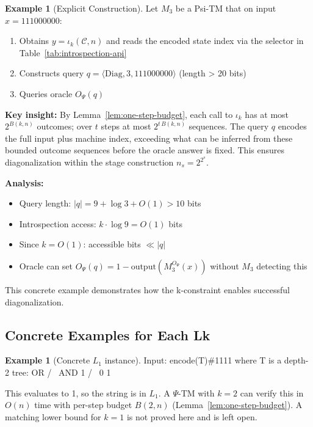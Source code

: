 \documentclass[11pt]{article}
\theoremstyle{plain}
\theoremstyle{definition}
\newtheorem{example}[theorem]{Example}
\newcommand{\PSi}{\Psi}
\begin{document}
\begin{example}[Explicit Construction]
\label{ex:concrete-diagonalization}
Let $M_3$ be a Psi-TM that on input $x = 111000000$:
\begin{enumerate}
\item Obtains $y=\iota_k(\mathcal{C},n)$ and reads the encoded state index via the selector in Table~\ref{tab:introspection-api}
\item Constructs query $q = \langle \text{Diag}, 3, 111000000 \rangle$ (length > 20 bits)
\item Queries oracle $O_\Psi(q)$
\end{enumerate}

\textbf{Key insight:} By Lemma~\ref{lem:one-step-budget}, each call to $\iota_k$ has at most $2^{B(k,n)}$ outcomes; over $t$ steps at most $2^{t\,B(k,n)}$ sequences. The query $q$ encodes the full input plus machine index, exceeding what can be inferred from these bounded outcome sequences before the oracle answer is fixed. This ensures diagonalization within the stage construction $n_s=2^{2^s}$.

\textbf{Analysis:}
\begin{itemize}
\item Query length: $|q| = 9 + \log 3 + O(1) > 10$ bits
\item Introspection access: $k \cdot \log 9 = O(1)$ bits
\item Since $k = O(1)$: accessible bits $\ll |q|$
\item Oracle can set $O_\Psi(q) = 1 - \text{output}(M_3^{O_\Psi}(x))$ without $M_3$ detecting this
\end{itemize}

This concrete example demonstrates how the k-constraint enables successful diagonalization.
\end{example}

\subsection{Concrete Examples for Each Lk}

\begin{example}[Concrete $L_1$ instance]
Input: encode(T)\#1111 where T is a depth-2 tree:
       OR
      /  \
    AND   1
    / \
   0   1
   
This evaluates to 1, so the string is in $L_1$.
A $\PSi$-TM with $k=2$ can verify this in $O(n)$ time with per-step budget $B(2,n)$ (Lemma~\ref{lem:one-step-budget}). A matching lower bound for $k=1$ is not proved here and is left open.
\end{example}
\end{document}
